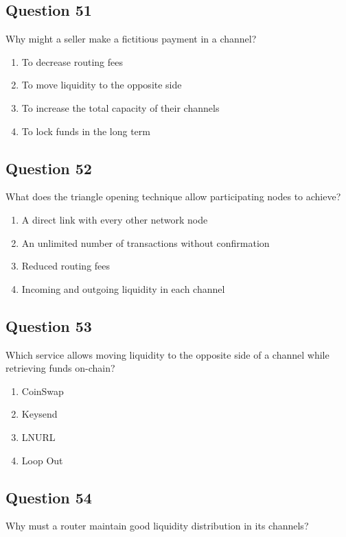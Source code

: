 \documentclass[12pt,a4paper]{article}
\begin{document}
\bigskip


\subsection*{Question 51}
Why might a seller make a fictitious payment in a channel?

\begin{enumerate}[label=\Alph*., leftmargin=*]
\item To decrease routing fees
\item To move liquidity to the opposite side
\item To increase the total capacity of their channels
\item To lock funds in the long term
\end{enumerate}

\bigskip


\subsection*{Question 52}
What does the triangle opening technique allow participating nodes to achieve?

\begin{enumerate}[label=\Alph*., leftmargin=*]
\item A direct link with every other network node
\item An unlimited number of transactions without confirmation
\item Reduced routing fees
\item Incoming and outgoing liquidity in each channel
\end{enumerate}

\bigskip


\subsection*{Question 53}
Which service allows moving liquidity to the opposite side of a channel while retrieving funds on-chain?

\begin{enumerate}[label=\Alph*., leftmargin=*]
\item CoinSwap
\item Keysend
\item LNURL
\item Loop Out
\end{enumerate}

\bigskip


\subsection*{Question 54}
Why must a router maintain good liquidity distribution in its channels?
\end{document}
